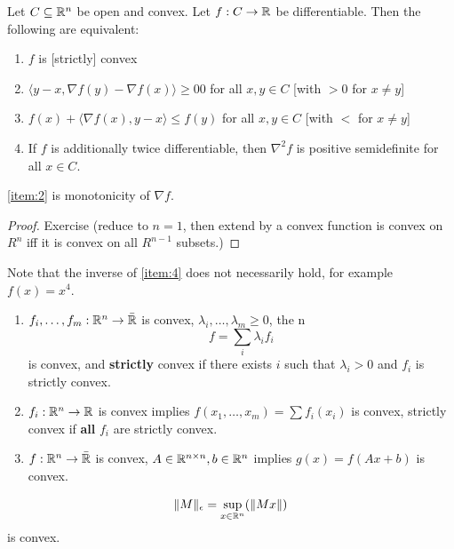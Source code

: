 \begin{thm}
  \label{defn:convexity:6}
  Let $C \subseteq \mathbb{R}^{n}$ be open and convex.  Let $f: C \rightarrow
  \mathbb{R}$ be differentiable. Then the following are equivalent:
  \begin{enumerate}
  \item \label{item:1} $f$ is [strictly] convex
  \item \label{item:2} $\langle y - x, \nabla f(y) - \nabla f(x) \rangle \geq 0 0$ for all
    $x, y \in C$ [with $> 0$ for $x \neq y$]
  \item \label{item:3} $f(x) + \langle \nabla f(x), y - x \rangle \leq f(y)$ for all
    $x, y \in C$ [with $<$ for $x \neq y$]
  \item \label{item:4} If $f$ is additionally twice differentiable, then $\nabla^{2}
    f$ is positive semidefinite for all $x \in C$.
  \end{enumerate}

  \ref{item:2} is monotonicity of $\nabla f$.
\end{thm}

\begin{proof}
  Exercise (reduce to $n=1$, then extend by a convex function is
  convex on $R^{n}$ iff it is convex on all $R^{n-1}$ subsets.)
\end{proof}

\begin{remark}
  Note that the inverse of \ref{item:4} does not necessarily hold, for
  example $f(x) = x^{4}$.
\end{remark}

\begin{proposition}
  \begin{enumerate}
  \item $f_{i}, \dots, f_{m}: \mathbb{R}^{n} \rightarrow \bar {\mathbb{R}}$ is convex,
    $\lambda_{i}, \dots, \lambda_{m} \geq 0$, the n
    \begin{equation}
      \label{eq:20}
      f = \sum_{i} \lambda_{i} f_{i}
    \end{equation} is convex, and \textbf{strictly} convex if there
    exists $i$ such that $\lambda_{i} > 0$ and $f_{i}$ is strictly convex.
  \item $f_{i}: \mathbb{R}^{n} \rightarrow \mathbb{R}$ is convex implies $f(x_{1},
    \dots, x_{m}) = \sum f_{i}(x_{i})$ is convex, strictly convex if
    \textbf{all} $f_i$ are strictly convex.
  \item $f: \mathbb{R}^{n} \rightarrow \bar {\mathbb{R}}$ is convex, $A \in \mathbb{R}^{n \times
    n}, b \in \mathbb{R}^{n}$ implies $g(x) = f(Ax + b)$ is convex.
  \end{enumerate}
\end{proposition}

\begin{remark}
  \begin{align*}
    \| M \|_{\epsilon} = \sup_{x \in \mathbb{R}^{n}} (\| M x\|)
  \end{align*} is convex.
\end{remark}

